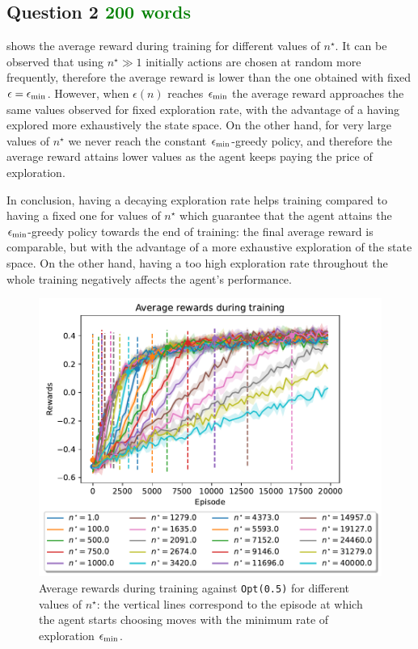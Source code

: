 \documentclass[10pt]{IEEEtran}
\begin{document}
\subsection*{Question 2  \textcolor{green}{200 words}}
 shows the average reward during training for different values of $n^{\star}$. It can be observed that using $n^{\star} \gg 1$ initially actions are chosen at random more frequently, therefore the average reward is lower than the one obtained with fixed $\epsilon = \epsilon_{\text{min}}$. However, when $\epsilon(n)$ reaches $\epsilon_{\text{min}}$ the average reward approaches the same values observed for fixed exploration rate, with the advantage of a having explored more exhaustively the state space. On the other hand, for very large values of $n^{\star}$ we never reach the constant $\epsilon_{\text{min}}$-greedy policy, and therefore the average reward attains lower values as the agent keeps paying the price of exploration.

In conclusion, having a decaying exploration rate helps training compared to having a fixed one for values of $n^{\star}$ which guarantee that the agent attains the $\epsilon_{\text{min}}$-greedy policy towards the end of training: the final average reward is comparable, but with the advantage of a more exhaustive exploration of the state space. On the other hand, having a too high exploration rate throughout the whole training negatively affects the agent's performance.

\begin{figure}[h]
    \centering
    \includegraphics[width = 0.85\linewidth]{code/figures/rewards_n_star.pdf}
    \caption{Average rewards during training against \texttt{Opt(0.5)} for different values of $n^{\star}$: the vertical lines correspond to the episode at which the agent starts choosing moves with the minimum rate of exploration $\epsilon_{\text{min}}$.}%
    \label{plot_question2}
\end{figure}
\end{document}
